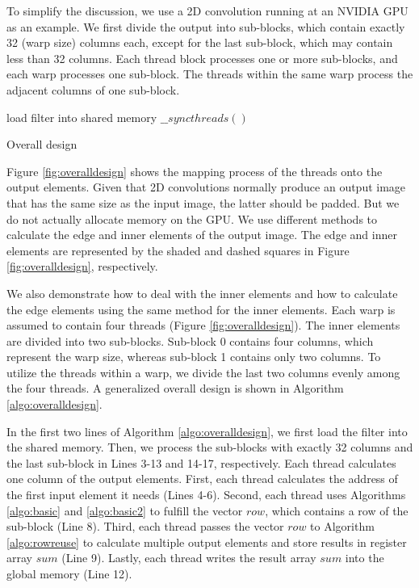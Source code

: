To simplify the discussion, we use a 2D convolution running at an NVIDIA GPU as an example. We first divide the output
into sub-blocks, which contain exactly 32 (warp size) columns each, except for the last sub-block, which may contain less than 32 columns.
Each thread block processes one or more sub-blocks, and each warp processes one sub-block. The threads within the same warp process the adjacent columns of one sub-block.
\begin{algorithm}
	load filter into shared memory\;
	$\_\_syncthreads()$\;
	\caption{Overall design}
	\label{algo:overalldesign}
\end{algorithm}

Figure \ref{fig:overalldesign} shows the mapping process of the threads onto the output elements. Given that 2D convolutions normally produce an output image that has the same size as the input image, the latter should be padded. But we do not actually allocate memory on the GPU. We use different methods to calculate the edge and inner elements of the output image. The edge and inner elements are represented by the shaded and dashed squares in Figure \ref{fig:overalldesign}, respectively.

We also demonstrate how to deal with the inner elements and how to  calculate the edge elements using the same method for the inner elements. Each warp is assumed to contain four threads (Figure \ref{fig:overalldesign}). The inner elements are divided into two
sub-blocks. Sub-block 0 contains four columns, which represent the warp size, whereas sub-block 1 contains only two columns. To utilize the threads within a warp, we divide the last two columns evenly among the four threads. A generalized overall design is shown in Algorithm \ref{algo:overalldesign}.

In the first two lines of Algorithm \ref{algo:overalldesign}, we first load the filter into the shared memory. Then, we process the sub-blocks with exactly 32 columns and the last sub-block in Lines 3-13 and 14-17, respectively. Each thread calculates one column of the output elements. First, each thread calculates the address of the first input element it needs (Lines 4-6). Second, each thread uses Algorithms \ref{algo:basic} and \ref{algo:basic2} to fulfill the vector $row$, which contains a row of the sub-block (Line 8). Third, each thread passes the
vector $row$ to Algorithm \ref{algo:rowreuse} to calculate multiple output elements and store results in register array $sum$ (Line 9).
Lastly, each thread writes the result array $sum$ into the global memory (Line 12).
